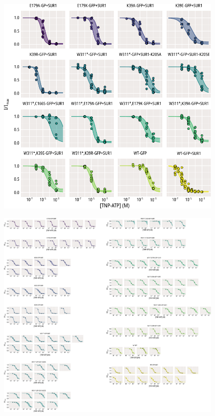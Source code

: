 \begin{figure}[h]
	\centering
	\includegraphics[width=\textwidth]{all_tnpatp_fits.pdf}
	\caption[TNP-ATP inhibition population hill fits]{
	}
	\label{apxfig:tnpatp_inhib_1}
\end{figure}

\begin{figure}[h]
	\centering
	\includegraphics[width=\textwidth]{all_tnpatp_fits_2.pdf}
	\caption[TNP-ATP inhibition sample hill fits]{
	}
	\label{apxfig:tnpatp_inhib_2}
\end{figure}

